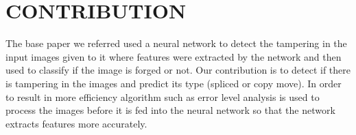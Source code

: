 \section{CONTRIBUTION}
The base paper we referred used a neural network to detect the tampering in the input images given to it where features were extracted by the network and then used to classify if the image is forged or not. Our contribution is to detect if there is tampering in the images and predict its type (spliced or copy move). In order to result in more efficiency algorithm such as error level analysis is used to process the images before it is fed into the neural network so that the network extracts features more accurately.





       



     
          
          
          
        
    

\newline
\newpage
